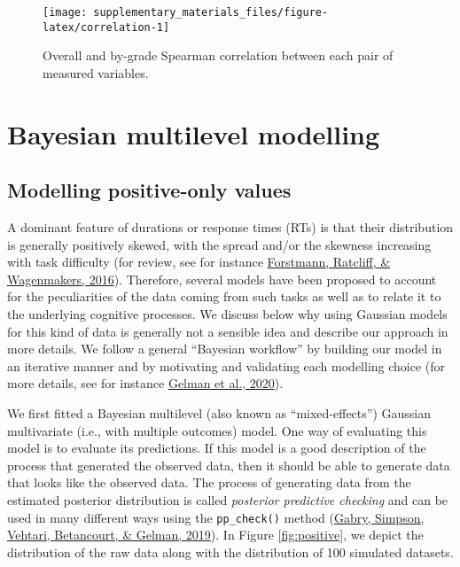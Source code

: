 \documentclass[
  11pt,
  english,
  ,doc,floatsintext]{apa6}
\begin{document}
\begin{figure}[!htb]

{\centering \texttt{[image: supplementary\_materials\_files/figure-latex/correlation-1]} 

}

\caption{Overall and by-grade Spearman correlation between each pair of measured variables.}\label{fig:correlation}
\end{figure}

\newpage

\hypertarget{bayesian-multilevel-modelling}{%
\section{Bayesian multilevel modelling}\label{bayesian-multilevel-modelling}}

\hypertarget{modelling-positive-only-values}{%
\subsection{Modelling positive-only values}\label{modelling-positive-only-values}}

A dominant feature of durations or response times (RTs) is that their distribution is generally positively skewed, with the spread and/or the skewness increasing with task difficulty (for review, see for instance \protect\hyperlink{ref-forstmann_sequential_2016}{Forstmann, Ratcliff, \& Wagenmakers, 2016}). Therefore, several models have been proposed to account for the peculiarities of the data coming from such tasks as well as to relate it to the underlying cognitive processes. We discuss below why using Gaussian models for this kind of data is generally not a sensible idea and describe our approach in more details. We follow a general ``Bayesian workflow'' by building our model in an iterative manner and by motivating and validating each modelling choice (for more details, see for instance \protect\hyperlink{ref-gelman_bayesian_2020}{Gelman et al., 2020}).

We first fitted a Bayesian multilevel (also known as ``mixed-effects'') Gaussian multivariate (i.e., with multiple outcomes) model. One way of evaluating this model is to evaluate its predictions. If this model is a good description of the process that generated the observed data, then it should be able to generate data that looks like the observed data. The process of generating data from the estimated posterior distribution is called \emph{posterior predictive checking} and can be used in many different ways using the \texttt{pp\_check()} method (\protect\hyperlink{ref-gabry_visualization_2019}{Gabry, Simpson, Vehtari, Betancourt, \& Gelman, 2019}). In Figure \ref{fig:positive}, we depict the distribution of the raw data along with the distribution of 100 simulated datasets.
\end{document}
